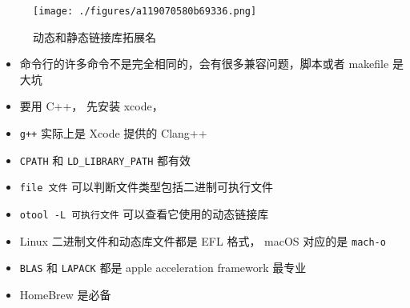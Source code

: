 
\begin{issues}
\issueDraft
\end{issues}

\begin{figure}[ht]
\centering
\texttt{[image: ./figures/a119070580b69336.png]}
\caption{动态和静态链接库拓展名} \label{fig_MacDev_1}
\end{figure}

\begin{itemize}
\item 命令行的许多命令不是完全相同的，会有很多兼容问题，脚本或者 makefile 是大坑
\item 要用 C++， 先安装 xcode， \item \verb`g++` 实际上是 Xcode 提供的 Clang++
\item \verb`CPATH` 和 \verb`LD_LIBRARY_PATH` 都有效
\item \verb`file 文件` 可以判断文件类型包括二进制可执行文件
\item \verb`otool -L 可执行文件` 可以查看它使用的动态链接库
\item Linux 二进制文件和动态库文件都是 EFL 格式， macOS 对应的是 \verb`mach-o`
\item \verb`BLAS` 和 \verb`LAPACK` 都是 apple acceleration framework 最专业
\item HomeBrew 是必备
\end{itemize}
